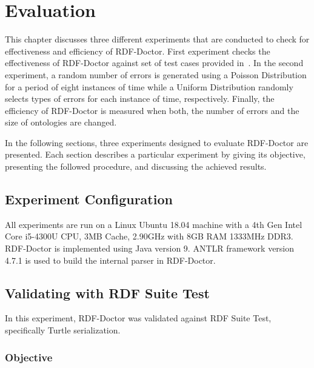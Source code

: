 \chapter{Evaluation}
\label{ch:evaluation}

This chapter discusses three different experiments that are conducted to check for effectiveness and efficiency of RDF-Doctor.
First experiment checks the effectiveness of RDF-Doctor against set of test cases provided in~\cite{TurtleTests:Online}.
In the second experiment, a random number of errors is generated using a Poisson Distribution for a period of eight instances of time while a Uniform Distribution randomly selects types of errors for each instance of time, respectively.
Finally, the efficiency of RDF-Doctor is measured when both, the number of errors and the size of ontologies are changed. 

In the following sections, three experiments designed to evaluate RDF-Doctor are presented. 
Each section describes a particular experiment by giving its objective, presenting the followed procedure, and discussing the achieved results.

\section{Experiment Configuration}

All experiments are run on a Linux Ubuntu 18.04 machine with a 4th Gen Intel Core i5-4300U CPU, 3MB Cache, 2.90GHz with 8GB RAM 1333MHz DDR3. 
RDF-Doctor is implemented using Java version 9. 
ANTLR framework version 4.7.1 is used to build the internal parser in RDF-Doctor.%

\section{Validating with RDF Suite Test} 
In this experiment, RDF-Doctor was validated against RDF Suite Test, specifically Turtle serialization. 

\subsection{Objective}


